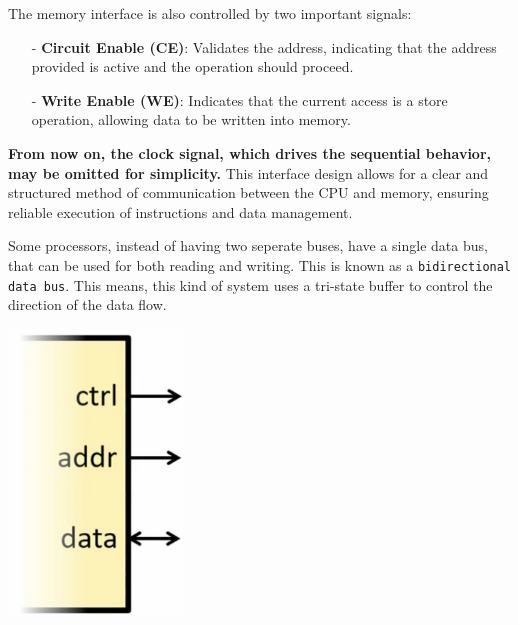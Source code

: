 The memory interface is also controlled by two important signals:
\begin{itemize}
    \item[-] \textbf{Circuit Enable (CE)}: Validates the address, indicating that the address provided is active and the operation should proceed.
    \item[-] \textbf{Write Enable (WE)}: Indicates that the current access is a store operation, allowing data to be written into memory.
\end{itemize}
\textbf{From now on, the clock signal, which drives the sequential behavior, may be omitted for simplicity.}
This interface design allows for a clear and structured method of communication between the CPU and memory, ensuring reliable execution of instructions and data management. \\
\begin{minipage}[htp]{0.45\textwidth}
    Some processors, instead of having two seperate buses, have a single data bus, that can be used for both reading and writing. This is known as a \texttt{bidirectional data bus}. This means, this kind of system uses a tri-state buffer to control the direction of the data flow.
\end{minipage}
\hfill
\vline
\hfill
\begin{minipage}[htp]{0.45\textwidth}
    \begin{center}
        \includegraphics[width=0.35\textwidth]{chapters/chapter2b/images/tristate.png}
    \end{center}
\end{minipage}
